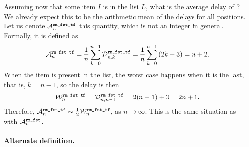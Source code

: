 Assuming now that some item \(I\) is in the list \(L\), what is the
average delay of ? We already expect
this to be the arithmetic mean of the delays for all positions. Let us
denote \(\ave{rm\_fst\_tf}{n}\) this quantity, which is not an integer
in general. Formally, it is defined as
\[
\ave{rm\_fst\_tf}{n}
  = \frac{1}{n}\sum_{k=0}^{n-1}{\comp{rm\_fst\_tf}{n,k}}
  = \frac{1}{n}\sum_{k=0}^{n-1}{(2k+3)} = n + 2.
\]
When the item is present in the list, the worst case happens when it
is the last, that is, \(k=n-1\), so the delay is then
\[
\worst{rm\_fst\_tf}{n} 
  = \comp{rm\_fst\_tf}{n,n-1} = 2(n-1)+3 = 2n + 1.
\]
Therefore, \(\ave{rm\_fst\_tf}{n} \mathrel{\sim} \tfrac{1}{2}
\worst{rm\_fst\_tf}{n}\), as \(n \rightarrow \infty\). This is the
same situation as with \(\ave{rm\_fst}{n}\).

\medskip

\paragraph{Alternate definition.}

